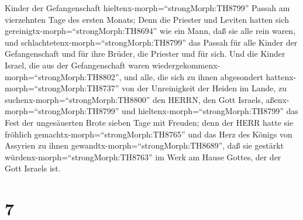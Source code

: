 Kinder der Gefangenschaft hieltenx-morph=``strongMorph:TH8799'' Passah
am vierzehnten Tage des ersten Monats;  Denn die Priester
und Leviten hatten sich gereinigtx-morph=``strongMorph:TH8694'' wie ein
Mann, daß sie alle rein waren, und
schlachtetenx-morph=``strongMorph:TH8799'' das Passah für alle Kinder
der Gefangenschaft und für ihre Brüder, die Priester und für sich.
 Und die Kinder Israel, die aus der Gefangenschaft waren
wiedergekommenx-morph=``strongMorph:TH8802'', und alle, die sich zu
ihnen abgesondert hattenx-morph=``strongMorph:TH8737'' von der
Unreinigkeit der Heiden im Lande, zu
suchenx-morph=``strongMorph:TH8800'' den HERRN, den Gott Israels,
aßenx-morph=``strongMorph:TH8799''  und
hieltenx-morph=``strongMorph:TH8799'' das Fest der ungesäuerten Brote
sieben Tage mit Freuden; denn der HERR hatte sie fröhlich
gemachtx-morph=``strongMorph:TH8765'' und das Herz des Königs von
Assyrien zu ihnen gewandtx-morph=``strongMorph:TH8689'', daß sie
gestärkt würdenx-morph=``strongMorph:TH8763'' im Werk am Hause Gottes,
der der Gott Israels ist.

\hypertarget{section-6}{%
\section{7}\label{section-6}}

